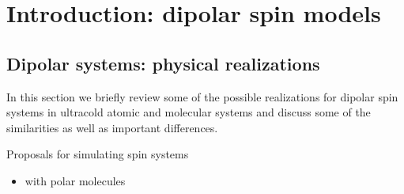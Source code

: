 \chapter{Introduction: dipolar spin models}
\label{dipolar_spinmodels}



\section{Dipolar systems: physical realizations}
In this section we briefly review some of the possible realizations for dipolar spin
systems in ultracold atomic and molecular systems and discuss some of the similarities as well as important differences.

Proposals for simulating spin systems
\begin{itemize}
    \item with polar molecules \cite{Micheli2006,Hauke2010,Gorshkov2011,Gorshkov2011b,Peter2012b,Syzranov2014,Peter2014}
\end{itemize}

